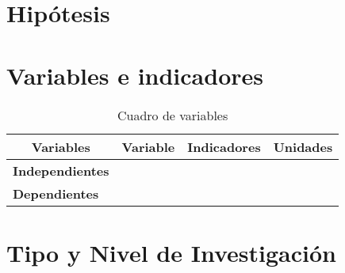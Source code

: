\section{Hipótesis}



\section{Variables e indicadores}

 \begin{table}[htbp]
 \caption{Cuadro de variables}\label{t1}
\begin{tabular}{lllccc}
\hline
\multicolumn{3}{c}{\textbf{Variables}}                       & \textbf{Variable}      & \textbf{Indicadores}                 & \textbf{Unidades} \\ \hline
\multicolumn{3}{c}{\multirow{2}{*}{\textbf{Independientes}}} &   &   & \\ \cline{4-6} 
\multicolumn{3}{c}{}                                         &   &   & \\ \hline
\multicolumn{3}{l}{\multirow{4}{*}{\textbf{Dependientes}}}   &   &   & \\ \cline{4-6} 
\multicolumn{3}{l}{}                                         &   &   & \\ \cline{4-6} 
\multicolumn{3}{l}{}                                         &   &   & \\ \cline{4-6} 
\multicolumn{3}{l}{}                                         &   &   & \\ \hline
\end{tabular}
\end{table}

\section{Tipo y Nivel de Investigación}



